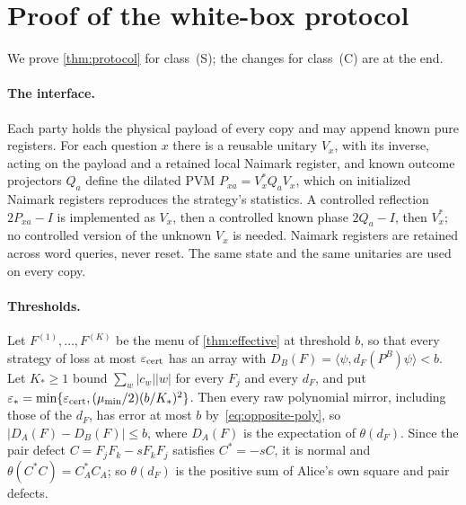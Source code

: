 \section{Proof of the white-box protocol}\label{app:protocol}

We prove \cref{thm:protocol} for class~(S); the changes for class~(C) are at the end.

\paragraph{The interface.} Each party holds the physical payload of every copy and may append known pure registers. For
each question $x$ there is a reusable unitary $V_x$, with its inverse, acting on the payload and a retained local Naimark
register, and known outcome projectors $Q_a$ define the dilated PVM $P_{xa}=V_x^*Q_aV_x$, which on initialized Naimark
registers reproduces the strategy's statistics. A controlled reflection $2P_{xa}-I$ is implemented as $V_x$, then a
controlled known phase $2Q_a-I$, then $V_x^*$; no controlled version of the unknown $V_x$ is needed. Naimark registers
are retained across word queries, never reset. The same state and the same unitaries are used on every copy.

\paragraph{Thresholds.} Let $F^{(1)},\dots,F^{(K)}$ be the menu of \cref{thm:effective} at threshold $b$, so that every
strategy of loss at most $\varepsilon_{\mathrm{cert}}$ has an array with $D_B(F)=\langle\psi,d_F(P^B)\psi\rangle<b$. Let $K_*\ge1$
bound $\sum_w|c_w||w|$ for every $F_j$ and every $d_F$, and put $\varepsilon_*=\min\{\varepsilon_{\mathrm{cert}},(\mu_{\min}/2)(b/K_*)^2\}$.
Then every raw polynomial mirror, including those of the $d_F$, has error at most $b$ by~\eqref{eq:opposite-poly}, so
$|D_A(F)-D_B(F)|\le b$, where $D_A(F)$ is the expectation of $\theta(d_F)$. Since the pair defect $C=F_jF_k-s F_kF_j$ satisfies
$C^*=-sC$, it is normal and $\theta(C^*C)=C_A^*C_A$; so $\theta(d_F)$ is the positive sum of Alice's own square and pair
defects.

